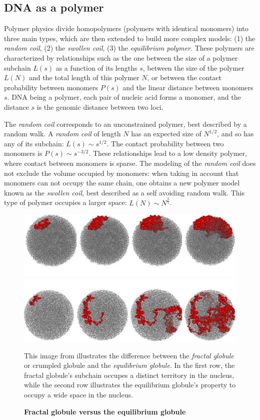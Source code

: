 \subsection{DNA as a polymer}

Polymer physics divide homopolymers (polymers with identical monomers) into
three main types, which are then extended to build more complex models: (1) the
\textit{random coil}, (2) the \textit{swollen coil}, (3) the
\textit{equilibrium polymer}. These polymers are characterized by
relationships such as the one between the size of a polymer subchain $L(s)$ as
a function of its lengths $s$, between the size of the polymer $L(N)$ and the
total length of this polymer $N$, or between the contact probability between
monomers $P(s)$ and the linear distance between monomers $s$. DNA being a
polymer, each pair of nucleic acid forms a monomer, and the distance $s$ is the
genomic distance between two loci.

The \textit{random coil} corresponds to an unconstrained polymer, best
described by a random walk. A \textit{random coil} of length $N$ has an
expected size of $N^{1/2}$, and so has any of its subchain: $L(s) \sim
s^{1/2}$. The contact probability between two monomers is $P(s) \sim
s^{-3/2}$. These relationships lead to a low density polymer, where contact
between monomers is sparse. The modeling of the \textit{random coil} does not
exclude the volume occupied by monomers: when taking in account that monomers
can not occupy the same chain, one obtains a new polymer model known as the
\textit{swollen coil}, best described as a self avoiding random walk. This
type of polymer occupies a larger space: $L(N) \sim N^{\frac{3}{5}}$.

\begin{figure}
\begin{center}
\includegraphics[width=0.8\linewidth]{figures/mirny_fractal.png}
\includegraphics[width=0.8\linewidth]{figures/mirny_equilibrium.png}
\end{center}
\caption{\textbf{Fractal globule versus the equilibrium globule}}{This image
from \citet{mirny:fractal} illustrates the difference between the
\textit{fractal globule} or crumpled globule and the
\textit{equilibrium globule}. In the first row, the
fractal globule's subchain occupes a distinct territory in the nucleus, while
the second row illustrates the equilibrium globule's property to occupy a wide
space in the nucleus.}
\end{figure}

